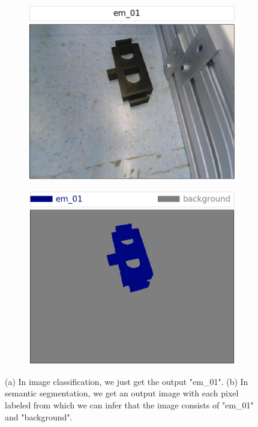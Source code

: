 	\begin{figure}
		\centering
		\begin{subfigure}{.4\textwidth}
			\centering
			\includegraphics[width=1\linewidth]{images/classification}
			\caption{}
			\label{Fig:cls}
		\end{subfigure}
		\begin{subfigure}{.4\textwidth}
			\centering
			\includegraphics[width=1\linewidth]{images/segmentation}
			\caption{}
			\label{Fig:seg}
		\end{subfigure}
		\caption{(a) In image classification, we just get the output "em\_01". (b) In semantic segmentation, we get an output image with each pixel labeled from which we can infer that the image consists of "em\_01" and "background".}
		\label{Fig:clsseg}
	\end{figure}
	
